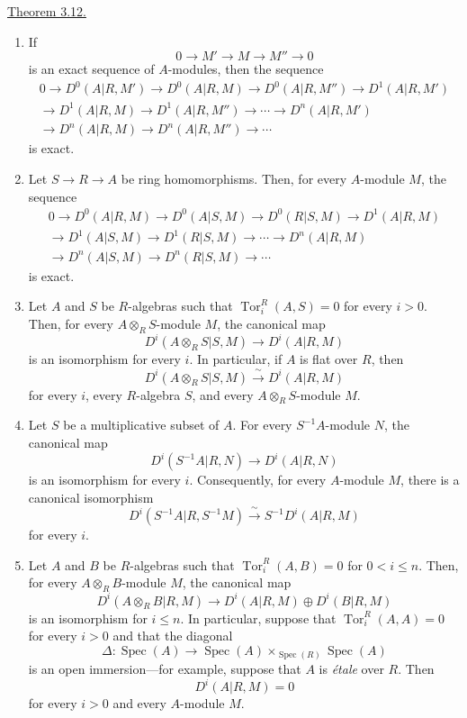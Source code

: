 
\underline{Theorem 3.12.}

\begin{enumerate}[label=(\arabic*)]
\item If
\[
 0\longrightarrow M'\longrightarrow M\longrightarrow M''
 \longrightarrow0
\]
is an exact sequence of $A$-modules, then the sequence
\begin{multline*}
0\longrightarrow D^0(A|R,M')\longrightarrow D^0(A|R,M)
\longrightarrow D^0(A|R,M'')\longrightarrow D^1(A|R,M')\\
\longrightarrow D^1(A|R,M)\longrightarrow D^1(A|R,M'')
\longrightarrow\cdots\longrightarrow D^n(A|R,M')\\
\longrightarrow D^n(A|R,M)\longrightarrow D^n(A|R,M'')
\longrightarrow\cdots
\end{multline*}
is exact.

\item Let $S\longrightarrow R\longrightarrow A$ be ring
homomorphisms. Then, for every $A$-module $M$, the sequence
\begin{multline*}
0\longrightarrow D^0(A|R,M)\longrightarrow D^0(A|S,M)
\longrightarrow D^0(R|S,M)\longrightarrow D^1(A|R,M)\\
\longrightarrow D^1(A|S,M)\longrightarrow D^1(R|S,M)
\longrightarrow\cdots\longrightarrow D^n(A|R,M)\\
\longrightarrow D^n(A|S,M)\longrightarrow D^n(R|S,M)
\longrightarrow\cdots
\end{multline*}
is exact.

\item Let $A$ and $S$ be $R$-algebras such that
$\operatorname{Tor}_i^R(A,S)=0$ for every $i>0$. Then, for every
$A\otimes_RS$-module $M$, the canonical map
\[
 D^i(A\otimes_RS|S,M)\longrightarrow D^i(A|R,M)
\]
is an isomorphism for every $i$. In particular, if $A$ is flat
over $R$, then
\[
 D^i(A\otimes_RS|S,M)\xrightarrow{\ \sim\ }D^i(A|R,M)
\]
for every $i$, every $R$-algebra $S$, and every
$A\otimes_RS$-module $M$.

\item Let $S$ be a multiplicative subset of $A$. For every
$S^{-1}A$-module $N$, the canonical map
\[
 D^i(S^{-1}A|R,N)\longrightarrow D^i(A|R,N)
\]
is an isomorphism for every $i$. Consequently, for every
$A$-module $M$, there is a canonical isomorphism
\[
 D^i(S^{-1}A|R,S^{-1}M)
 \xrightarrow{\ \sim\ }S^{-1}D^i(A|R,M)
\]
for every $i$.

\item Let $A$ and $B$ be $R$-algebras such that
$\operatorname{Tor}_i^R(A,B)=0$ for $0<i\leq n$. Then, for every
$A\otimes_RB$-module $M$, the canonical map
\[
 D^i(A\otimes_RB|R,M)
 \longrightarrow D^i(A|R,M)\oplus D^i(B|R,M)
\]
is an isomorphism for $i\leq n$. In particular, suppose that
$\operatorname{Tor}_i^R(A,A)=0$ for every $i>0$ and that the
diagonal
\[
 \Delta:\operatorname{Spec}(A)\longrightarrow
 \operatorname{Spec}(A)\times_{\operatorname{Spec}(R)}
 \operatorname{Spec}(A)
\]
is an open immersion---for example, suppose that $A$ is \emph{étale}
over $R$. Then
\[
 D^i(A|R,M)=0
\]
for every $i>0$ and every $A$-module $M$.


\end{enumerate}
